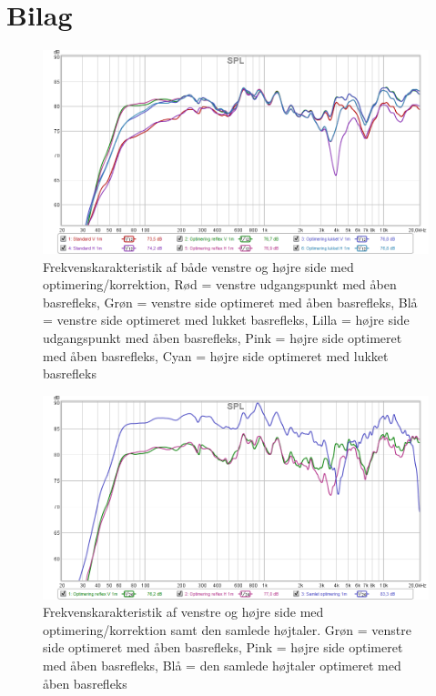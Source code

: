 \section{Bilag}

\begin{figure}[H] 
	\center
	\includegraphics[width=1\linewidth]{figur/Optimering-forskel-VH}\quad
	\caption{Frekvenskarakteristik af både venstre og højre side med optimering/korrektion, Rød = venstre udgangspunkt med åben basrefleks, Grøn = venstre side optimeret med åben basrefleks, Blå = venstre side optimeret med lukket basrefleks, Lilla = højre side udgangspunkt med åben basrefleks, Pink = højre side optimeret med åben basrefleks, Cyan = højre side optimeret med lukket basrefleks}
	\label{fig:Optimering-forskel-VH}
\end{figure}

\begin{figure}[H] 
	\center
	\includegraphics[width=1\linewidth]{figur/Samlet-Optimering}\quad
	\caption{Frekvenskarakteristik af venstre og højre side med optimering/korrektion samt den samlede højtaler. Grøn =  venstre side optimeret med åben basrefleks, Pink = højre side optimeret med åben basrefleks, Blå = den samlede højtaler optimeret med åben basrefleks}
	\label{fig:Samlet-Optimering}
\end{figure}

